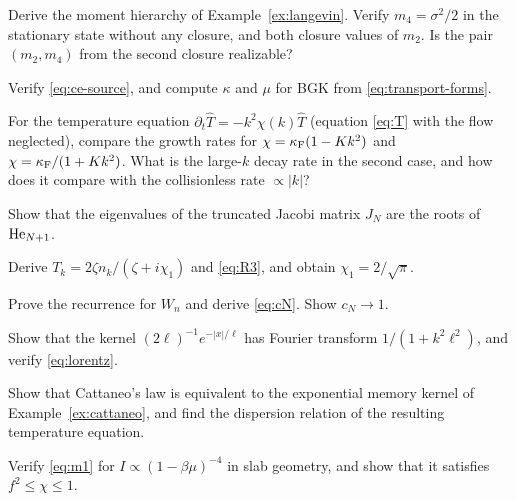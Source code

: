 \begin{exercise}
Derive the moment hierarchy of Example~\ref{ex:langevin}. Verify
$m_4=\sigma^2/2$ in the stationary state without any closure, and both
closure values of $m_2$. Is the pair $(m_2,m_4)$ from the second closure
realizable?
\end{exercise}

\begin{exercise}
Verify \eqref{eq:ce-source}, and compute $\kappa$ and $\mu$ for BGK from
\eqref{eq:transport-forms}.
\end{exercise}

\begin{exercise}
For the temperature equation
$\partial_t\hat T=-k^2\chi(k)\hat T$ (equation \eqref{eq:T} with the flow
neglected), compare the growth rates for $\chi=\kappa_{\mathrm F}(1-Kk^2)$ and
$\chi=\kappa_{\mathrm F}/(1+Kk^2)$. What is the large-$k$ decay rate in the second case,
and how does it compare with the collisionless rate $\propto|k|$?
\end{exercise}

\begin{exercise}
Show that the eigenvalues of the truncated Jacobi matrix $J_N$ are the
roots of $\mathrm{He}_{N+1}$.
\end{exercise}

\begin{exercise}
Derive $T_k=2\zeta n_k/(\zeta+i\chi_1)$ and \eqref{eq:R3}, and obtain
$\chi_1=2/\sqrt\pi$.
\end{exercise}

\begin{exercise}
Prove the recurrence for $W_n$ and derive \eqref{eq:cN}. Show
$c_N\to1$.
\end{exercise}

\begin{exercise}
Show that the kernel $(2\ell)^{-1}e^{-|x|/\ell}$ has Fourier transform
$1/(1+k^2\ell^2)$, and verify \eqref{eq:lorentz}.
\end{exercise}

\begin{exercise}
Show that Cattaneo's law is equivalent to the exponential memory kernel of
Example~\ref{ex:cattaneo}, and find the dispersion relation of the
resulting temperature equation.
\end{exercise}

\begin{exercise}
Verify \eqref{eq:m1} for $I\propto(1-\beta\mu)^{-4}$ in slab geometry, and
show that it satisfies $f^2\le\chi\le1$.
\end{exercise}

